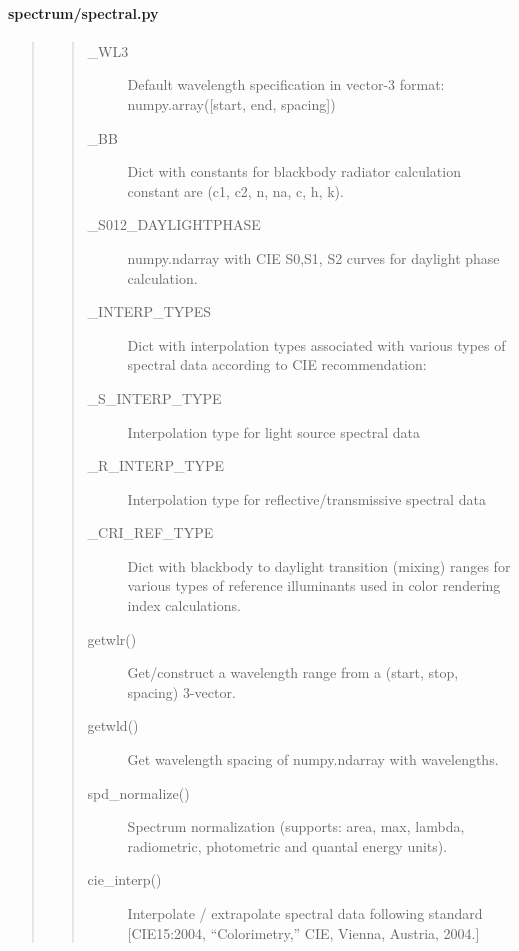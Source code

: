 \documentclass[letterpaper,10pt,english]{sphinxmanual}
\begin{document}
\paragraph{spectrum/spectral.py}
\label{\detokenize{spectrum:spectrum-spectral-py}}\begin{quote}
\begin{quote}\begin{description}
\item[{\_WL3}] \leavevmode
Default wavelength specification in vector-3 format: 
numpy.array({[}start, end, spacing{]})

\item[{\_BB}] \leavevmode
Dict with constants for blackbody radiator calculation 
constant are (c1, c2, n, na, c, h, k).

\item[{\_S012\_DAYLIGHTPHASE}] \leavevmode
numpy.ndarray with CIE S0,S1, S2 curves for daylight 
phase calculation.

\item[{\_INTERP\_TYPES}] \leavevmode
Dict with interpolation types associated with various types of
spectral data according to CIE recommendation:

\item[{\_S\_INTERP\_TYPE}] \leavevmode
Interpolation type for light source spectral data

\item[{\_R\_INTERP\_TYPE}] \leavevmode
Interpolation type for reflective/transmissive spectral data

\item[{\_CRI\_REF\_TYPE}] \leavevmode
Dict with blackbody to daylight transition (mixing) ranges for
various types of reference illuminants used in color rendering
index calculations.

\item[{getwlr()}] \leavevmode
Get/construct a wavelength range from a (start, stop, spacing) 
3-vector.

\item[{getwld()}] \leavevmode
Get wavelength spacing of numpy.ndarray with wavelengths.

\item[{spd\_normalize()}] \leavevmode
Spectrum normalization (supports: area, max, lambda, 
radiometric, photometric and quantal energy units).

\item[{cie\_interp()}] \leavevmode
Interpolate / extrapolate spectral data following standard 
{[}CIE15:2004, “Colorimetry,” CIE, Vienna, Austria, 2004.{]}


\end{description}
\end{quote}
\end{quote}
\end{document}
